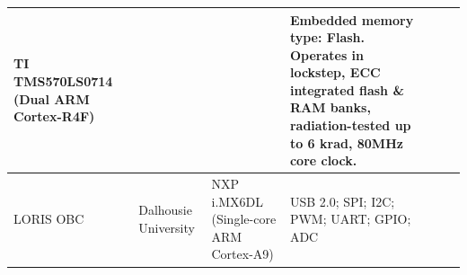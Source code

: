 \documentclass[10pt]{../datasheet}
\let\cite\citep
\begin{document}
\begin{landscape}
\begin{longtable}{|p{2.6cm}|p{2.0cm}|p{3.8cm}|p{3.8cm}|p{1.4cm}|p{6.4cm}|p{1.0cm}|}
    TI TMS570LS0714 (Dual ARM Cortex-R4F)                                                                                                                                                                                                                                             &
                                                                                                                                                                                                                                                                                      &
                                                                                                                                                                                                                                                                                      &
    Embedded memory type: Flash. Operates in lockstep, ECC integrated flash \& RAM banks, radiation-tested up to 6 krad, 80MHz core clock.                                                                                                                                            &
    \cite{orcasat_obc_site, orcasat_obc_ds}                                                                                                                                                                                                                                                                                                                                                   \\ \hline
    LORIS OBC                                                                                                                                                                                                                                                                         &
    Dalhousie University                                                                                                                                                                                                                                                              &
    NXP i.MX6DL (Single-core ARM Cortex-A9)                                                                                                                                                                                                                                           &
    USB 2.0; SPI; I2C; PWM; UART; GPIO; ADC                                                                                                                                                                                                                                           &

\end{longtable}
\end{landscape}
\end{document}
